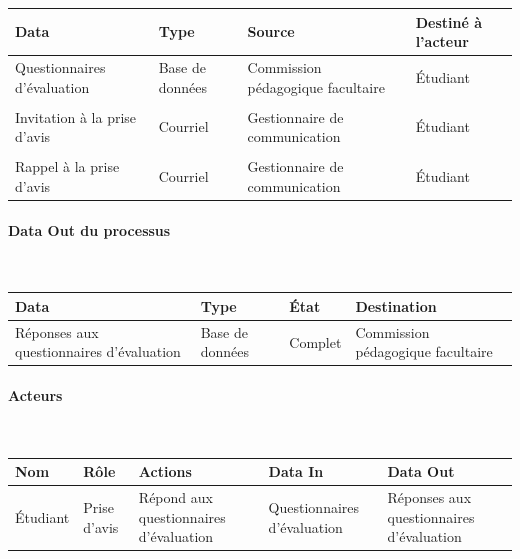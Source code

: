 \documentclass[a4paper,11pt]{report}
\begin{document}
\begin{tabularx}{\linewidth}{|X|X|X|X|} \hline
Data & Type & Source & Destiné à l'acteur \\ \hline
Questionnaires d'évaluation & Base de données & Commission pédagogique facultaire & Étudiant \\ 
& & & \\
Invitation à la prise d'avis & Courriel & Gestionnaire de communication & Étudiant \\
& & & \\
Rappel à la prise d'avis & Courriel & Gestionnaire de communication & Étudiant \\ \hline
\end{tabularx}

\paragraph{Data Out du processus}~\newline{}

\begin{tabularx}{\linewidth}{|X|X|X|X|} \hline
Data & Type & État & Destination \\ \hline
Réponses aux questionnaires d'évaluation & Base de données & Complet & Commission pédagogique facultaire \\ \hline
\end{tabularx}

\paragraph{Acteurs}~\newline{}

\begin{tabularx}{\linewidth}{|X|X|X|X|X|} \hline
Nom & Rôle & Actions & Data In & Data Out \\ \hline 
Étudiant & Prise d'avis & Répond aux questionnaires d'évaluation & Questionnaires d'évaluation & Réponses aux questionnaires d'évaluation \\ \hline
\end{tabularx}






\end{document}
